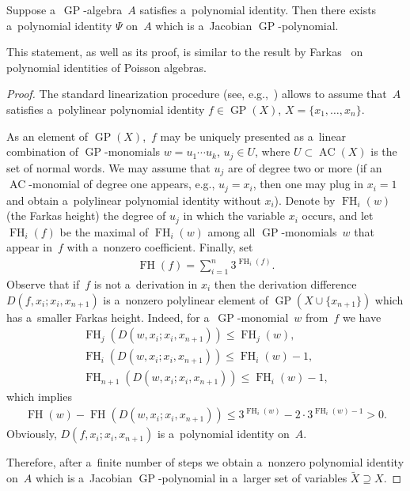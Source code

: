 \documentclass[pdftex]{sigma}
\begin{document}
\begin{proposition}
\label{prop:GPIdent:Jacobian}
Suppose a~$\operatorname{GP}$-algebra~$A$ satisfies a~polynomial identity.
Then there exists a~polynomial identity $\Psi $ on~$A$ which is a~Jacobian $\operatorname{GP}$-polynomial.
\end{proposition}

This statement, as well as its proof, is similar to the result by Farkas~\cite{FarkasI} on polynomial identities of
Poisson algebras.

\begin{proof}
The standard linearization procedure (see, e.g.,~\cite[Chapter~1]{ZSSS}) allows to assume that~$A$ satisf\/ies
a~polylinear polynomial identity $f\in \operatorname{GP}(X)$, $X=\{x_1,\dots, x_n\}$.

As an element of $\operatorname{GP}(X)$,~$f$ may be uniquely presented as a~linear combination of $\operatorname{GP}$-monomials $w=u_1\cdots u_k $,
$u_j\in U$, where $U\subset \operatorname{AC}(X)$ is the set of normal words.
We may assume that $u_j$ are of degree two or more (if an $\operatorname{AC}$-monomial of degree one appears, e.g., $u_j=x_i$, then one
may plug in $x_i=1$ and obtain a~polylinear polynomial identity without $x_i$).
Denote by $\operatorname{FH}_i(w)$ (the Farkas height) the degree of $u_j$ in which the variable $x_i$ occurs, and let $\operatorname{FH}_i(f)$ be the
maximal of $\operatorname{FH}_i(w)$ among all $\operatorname{GP}$-monomials~$w$ that appear in~$f$ with a~nonzero coef\/f\/icient.
Finally, set
\begin{gather*}
\operatorname{FH}(f) = \sum\limits_{i=1}^n 3^{\operatorname{FH}_i(f)}.
\end{gather*}
Observe that if~$f$ is not a~derivation in $x_i$ then the derivation dif\/ference $ D(f, x_i; x_i, x_{n+1}) $ is a~nonzero
polylinear element of $\operatorname{GP}(X\cup\{x_{n+1}\})$ which has a~smaller Farkas height.
Indeed, for a~$\operatorname{GP}$-monomial~$w$ from~$f$ we have
\begin{gather*}
\operatorname{FH}_j(D(w,x_i;x_i,x_{n+1}))\le \operatorname{FH}_j(w),
\\
\operatorname{FH}_{i}(D(w,x_i;x_i,x_{n+1}))\le \operatorname{FH}_i(w)-1,
\\
\operatorname{FH}_{n+1}(D(w,x_i;x_i,x_{n+1}))\le \operatorname{FH}_i(w)-1,
\end{gather*}
which implies
\begin{gather*}
\operatorname{FH}(w)-\operatorname{FH}(D(w,x_i;x_i,x_{n+1})) \le 3^{\operatorname{FH}_i(w)} - 2\cdot 3^{\operatorname{FH}_i(w)-1} >0.
\end{gather*}
Obviously, $D(f, x_i; x_i, x_{n+1})$ is a~polynomial identity on~$A$.

Therefore, after a~f\/inite number of steps we obtain a~nonzero polynomial identity on~$A$ which is a~Jacobian
$\operatorname{GP}$-polynomial in a~larger set of variables $\widetilde X\supseteq X$.
\end{proof}
\end{document}

